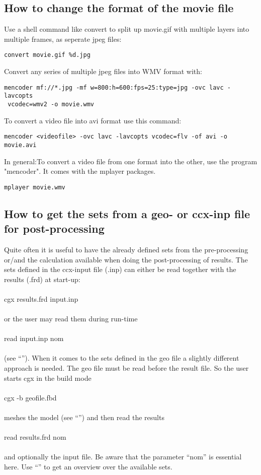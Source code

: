 \documentclass{article}
\begin{document}
\begin{appendix}
\subsection{\label{How to change the format of the movie file}How to change the format of the movie file}
Use a shell command like convert to split up movie.gif with multiple
layers into multiple frames, as seperate jpeg files:
\begin{verbatim}
convert movie.gif %d.jpg
\end{verbatim}
Convert any series of multiple jpeg files into WMV format with:
\begin{verbatim}
mencoder mf://*.jpg -mf w=800:h=600:fps=25:type=jpg -ovc lavc -lavcopts
 vcodec=wmv2 -o movie.wmv
\end{verbatim}
To convert a video file into avi format use this command:
\begin{verbatim}
mencoder <videofile> -ovc lavc -lavcopts vcodec=flv -of avi -o movie.avi
\end{verbatim}
In general:To convert a video file from one format into the other, use
the program "mencoder". It comes with the mplayer packages. 
\begin{verbatim}
mplayer movie.wmv
\end{verbatim}

\subsection{\label{How to get the sets from a geo- or ccx-inp file for post-processing}How to get the sets from a geo- or ccx-inp file for post-processing}
Quite often it is useful to have the already defined sets from the pre-processing or/and the calculation available when doing the post-processing of results. The sets defined in the ccx-input file (.inp) can either be read together with the results (.frd) at start-up:\\\\cgx results.frd input.inp\\\\or the user may read them during run-time\\\\read input.inp nom\\\\ (see ``''). When it comes to the sets defined in the geo file a slightly different approach is needed. The geo file must be read before the result file. So the user starts cgx in the build mode\\\\cgx -b geofile.fbd\\\\meshes the model (see ``'') and then read the results\\\\read results.frd nom\\\\and optionally the input file. Be aware that the parameter ``nom'' is essential here. Use ``'' to get an overview over the available sets.


\end{appendix}
\end{document}
